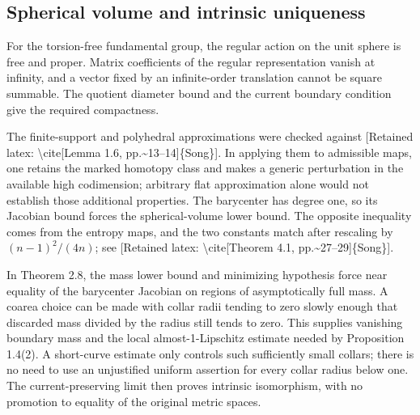 \documentclass[10pt]{article}
\begin{document}
\subsection*{Spherical volume and intrinsic uniqueness}
For the torsion-free fundamental group, the regular action on the unit sphere is free and proper. Matrix coefficients of the regular representation vanish at infinity, and a vector fixed by an infinite-order translation cannot be square summable. The quotient diameter bound and the current boundary condition give the required compactness.\par
The finite-support and polyhedral approximations were checked against [Retained latex: \textbackslash{}cite[Lemma 1.6, pp.\textasciitilde{}13--14]\{Song\}]. In applying them to admissible maps, one retains the marked homotopy class and makes a generic perturbation in the available high codimension; arbitrary flat approximation alone would not establish those additional properties. The barycenter has degree one, so its Jacobian bound forces the spherical-volume lower bound. The opposite inequality comes from the entropy maps, and the two constants match after rescaling by \((n-1)^2/(4n)\); see [Retained latex: \textbackslash{}cite[Theorem 4.1, pp.\textasciitilde{}27--29]\{Song\}].\par
In Theorem 2.8, the mass lower bound and minimizing hypothesis force near equality of the barycenter Jacobian on regions of asymptotically full mass. A coarea choice can be made with collar radii tending to zero slowly enough that discarded mass divided by the radius still tends to zero. This supplies vanishing boundary mass and the local almost-1-Lipschitz estimate needed by Proposition 1.4(2). A short-curve estimate only controls such sufficiently small collars; there is no need to use an unjustified uniform assertion for every collar radius below one. The current-preserving limit then proves intrinsic isomorphism, with no promotion to equality of the original metric spaces.\par
\end{document}
